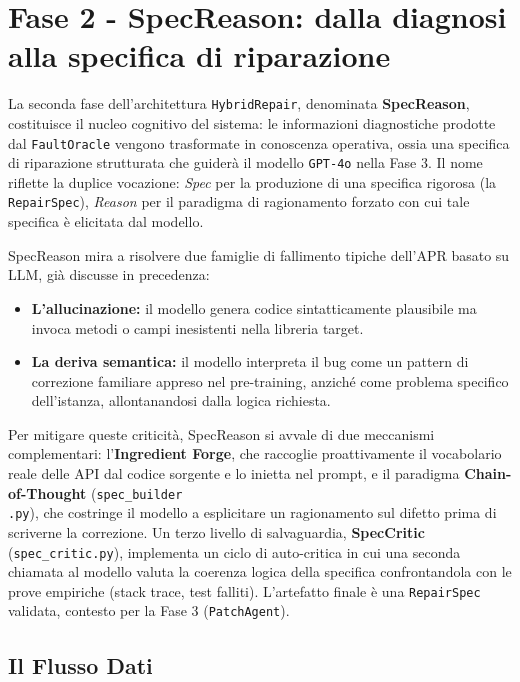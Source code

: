 \section{Fase 2 - SpecReason: dalla diagnosi alla specifica di riparazione}
\label{sec:fase2}

La seconda fase dell'architettura \texttt{HybridRepair}, denominata \textbf{SpecReason}, costituisce il nucleo
cognitivo del sistema: le informazioni diagnostiche prodotte dal \texttt{FaultOracle} vengono trasformate in
conoscenza operativa, ossia una specifica di riparazione strutturata che guiderà il modello \texttt{GPT-4o} nella
Fase 3. Il nome riflette la duplice vocazione: \textit{Spec} per la produzione di una specifica rigorosa (la
\texttt{RepairSpec}), \textit{Reason} per il paradigma di ragionamento forzato con cui tale specifica è elicitata
dal modello.

SpecReason mira a risolvere due famiglie di fallimento tipiche dell'APR basato su LLM, già discusse in precedenza:
\begin{itemize}
    \item \textbf{L'allucinazione:} il modello genera codice sintatticamente plausibile ma invoca metodi o campi
    inesistenti nella libreria target.
    \item \textbf{La deriva semantica:} il modello interpreta il bug come un pattern di correzione familiare appreso
    nel pre-training, anziché come problema specifico dell'istanza, allontanandosi dalla logica richiesta.
\end{itemize}

Per mitigare queste criticità, SpecReason si avvale di due meccanismi complementari: l'\textbf{Ingredient Forge},
che raccoglie proattivamente il vocabolario reale delle API dal codice sorgente e lo inietta nel prompt, e il
paradigma \textbf{Chain-of-Thought} (\texttt{spec\_builder\\.py}), che costringe il modello a esplicitare un
ragionamento sul difetto prima di scriverne la correzione. Un terzo livello di salvaguardia, \textbf{SpecCritic}
(\texttt{spec\_critic.py}), implementa un ciclo di auto-critica in cui una seconda chiamata al modello valuta la
coerenza logica della specifica confrontandola con le prove empiriche (stack trace, test falliti). L'artefatto
finale è una \texttt{RepairSpec} validata, contesto per la Fase 3 (\texttt{PatchAgent}).

\newpage
\subsection{Il Flusso Dati}
\label{subsec:flusso_dati}

